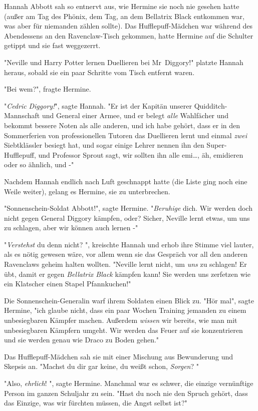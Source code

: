 {Hannah Abbott sah so entnervt aus, wie Hermine sie noch nie gesehen hatte (außer am Tag des Phönix, dem Tag, an dem Bellatrix Black entkommen war, was aber für niemanden zählen sollte). Das Hufflepuff-Mädchen war während des Abendessens an den Ravenclaw-Tisch gekommen, hatte Hermine auf die Schulter getippt und sie fast weggezerrt.

"Neville und Harry Potter lernen Duellieren bei Mr~Diggory!" platzte Hannah heraus, sobald sie ein paar Schritte vom Tisch entfernt waren.

"Bei wem?", fragte Hermine.

"\emph{Cedric} \emph{Diggory!}", sagte Hannah. "Er ist der Kapitän unserer Quidditch-Mannschaft und General einer Armee, und er belegt \emph{alle} Wahlfächer und bekommt bessere Noten als alle anderen, und ich habe gehört, dass er in den Sommerferien von professionellen Tutoren das Duellieren lernt und einmal \emph{zwei} Siebtklässler besiegt hat, und sogar einige Lehrer nennen ihn den Super-Hufflepuff, und Professor Sprout sagt, wir sollten ihn alle emi…, äh, emidieren oder so ähnlich, und -"

Nachdem Hannah endlich nach Luft geschnappt hatte (die Liste ging noch eine Weile weiter), gelang es Hermine, sie zu unterbrechen.

"Sonnenschein-Soldat Abbott!", sagte Hermine. "\emph{Beruhige} dich. Wir werden doch nicht gegen General Diggory kämpfen, oder? Sicher, Neville lernt etwas, um uns zu schlagen, aber wir können auch lernen -"

"\emph{Verstehst} du denn nicht? ", kreischte Hannah und erhob ihre Stimme viel lauter, als es nötig gewesen wäre, vor allem wenn sie das Gespräch vor all den anderen Ravenclaws geheim halten wollten. "Neville lernt nicht, um \emph{uns} zu schlagen! Er übt, damit er gegen \emph{Bellatrix Black} kämpfen kann! Sie werden uns zerfetzen wie ein Klatscher einen Stapel Pfannkuchen!"

Die Sonnenschein-Generalin warf ihrem Soldaten einen Blick zu. "Hör mal", sagte Hermine, "ich glaube nicht, dass ein paar Wochen Training jemanden zu einem unbesiegbaren Kämpfer machen. Außerdem \emph{wissen} wir bereits, wie man mit unbesiegbaren Kämpfern umgeht. Wir werden das Feuer auf sie konzentrieren und sie werden genau wie Draco zu Boden gehen."

Das Hufflepuff-Mädchen sah sie mit einer Mischung aus Bewunderung und Skepsis an. "Machst du dir gar keine, du weißt schon, \emph{Sorgen}? "

"Also, \emph{ehrlich}! ", sagte Hermine. Manchmal war es schwer, die einzige vernünftige Person im ganzen Schuljahr zu sein. "Hast du noch nie den Spruch gehört, dass das Einzige, was wir fürchten müssen, die Angst selbst ist?"

}
